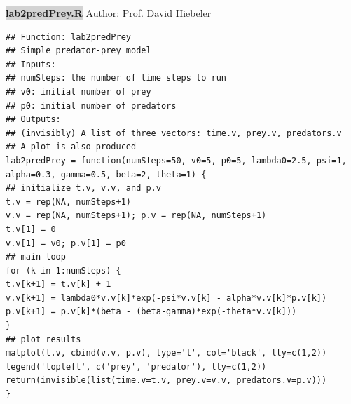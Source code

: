 \documentclass[11pt]{article}
\newcommand{\mybox}{%
    \collectbox{%
        \setlength{\fboxsep}{2pt}%
        \fbox{\BOXCONTENT}%
    }%
}
\begin{document}
\noindent\mybox{\colorbox{lightgray}{\textbf{lab2predPrey.R}}} Author: Prof. David Hiebeler

\vspace{3mm}

\begin{lstlisting}
## Function: lab2predPrey
## Simple predator-prey model
## Inputs:
## numSteps: the number of time steps to run
## v0: initial number of prey
## p0: initial number of predators
## Outputs:
## (invisibly) A list of three vectors: time.v, prey.v, predators.v
## A plot is also produced
lab2predPrey = function(numSteps=50, v0=5, p0=5, lambda0=2.5, psi=1,
alpha=0.3, gamma=0.5, beta=2, theta=1) {
## initialize t.v, v.v, and p.v
t.v = rep(NA, numSteps+1)
v.v = rep(NA, numSteps+1); p.v = rep(NA, numSteps+1)
t.v[1] = 0
v.v[1] = v0; p.v[1] = p0
## main loop
for (k in 1:numSteps) {
t.v[k+1] = t.v[k] + 1
v.v[k+1] = lambda0*v.v[k]*exp(-psi*v.v[k] - alpha*v.v[k]*p.v[k])
p.v[k+1] = p.v[k]*(beta - (beta-gamma)*exp(-theta*v.v[k]))
}
## plot results
matplot(t.v, cbind(v.v, p.v), type='l', col='black', lty=c(1,2))
legend('topleft', c('prey', 'predator'), lty=c(1,2))
return(invisible(list(time.v=t.v, prey.v=v.v, predators.v=p.v)))
}
\end{lstlisting}
\end{document}
